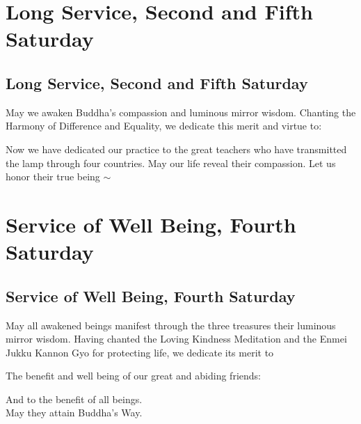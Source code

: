\documentclass{chantbook}
\begin{document}
\part{Long Service, Second and Fifth Saturday}
\chapter{Long Service, Second and Fifth Saturday}

\begin{service}
\kokyo \makaHannyaHaramittaShingyo
\kokyo \shosaimyoKichijoDharani
\kokyo {}
\sangha \allBuddhas
\kokyo \harmonyOfDifferenceAndEquality
\kokyo May we awaken Buddha's compassion and luminous mirror wisdom. Chanting
the Harmony of Difference and Equality, we dedicate this merit and virtue to:

\ancestorsLong

\kokyo Now we have dedicated our practice to the great teachers who have
transmitted the lamp through four countries. May our life reveal their
compassion. Let us honor their true being $\sim$ \largebell
\end{service}

\part{Service of Well Being, Fourth Saturday}
\chapter{Service of Well Being, Fourth Saturday}
\begin{service}
\kokyo \makaHannyaHaramittaShingyo
\kokyo \shosaimyoKichijoDharani
\kokyo {}
\kokyo \lovingKindnessMeditation
\kokyo \enmeiJukkuKannonGyo
\kokyo May all awakened beings manifest through the three treasures their
luminous mirror wisdom. Having chanted the Loving Kindness Meditation and the
Enmei Jukku Kannon Gyo for protecting life, we dedicate its merit to

The benefit and well being of our great and abiding friends: \hrulefill

And to the benefit of all beings.\\
May they attain Buddha's Way. \largebell
\end{service}
\end{document}
